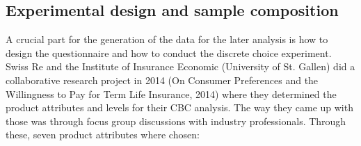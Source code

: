 \documentclass[12pt, abstracton]{article}
\begin{document}
\subsection{Experimental design and sample composition}
\label{exp_design}
A crucial part for the generation of the data for the later analysis is how to design the questionnaire and how to conduct the discrete choice experiment. Swiss Re and the Institute of Insurance Economic (University of St. Gallen) did a collaborative research project in 2014 (On Consumer Preferences and the Willingness to Pay for Term Life Insurance, 2014) where they determined the product attributes and levels for their CBC analysis. The way they came up with those was through focus group discussions with industry professionals. Through these, seven product attributes where chosen:
\begin{table}[H] \centering 
	\label{Premium_Levels} 
	\caption{Product attributes of a term life insurance contract used in the study.} 
\end{table}
\end{document}
